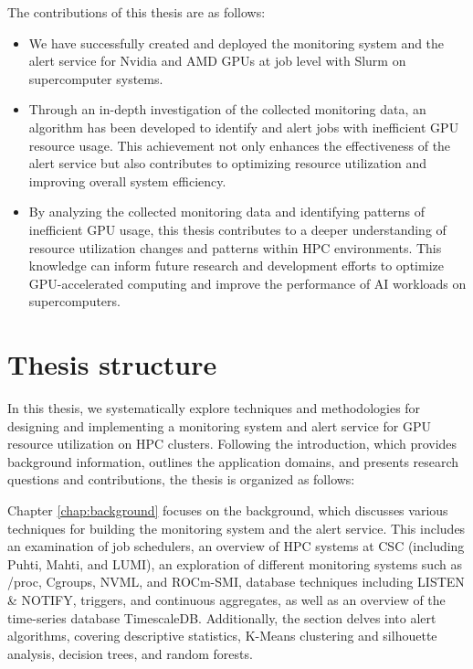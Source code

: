 The contributions of this thesis are as follows:

\begin{itemize}
    \item We have successfully created and deployed the monitoring system and the alert service for Nvidia and AMD GPUs at job level with Slurm on supercomputer systems.
    \item Through an in-depth investigation of the collected monitoring data, an algorithm has been developed to identify and alert jobs with inefficient GPU resource usage. This achievement not only enhances the effectiveness of the alert service but also contributes to optimizing resource utilization and improving overall system efficiency.
    \item By analyzing the collected monitoring data and identifying patterns of inefficient GPU usage, this thesis contributes to a deeper understanding of resource utilization changes and patterns within HPC environments. This knowledge can inform future research and development efforts to optimize GPU-accelerated computing and improve the performance of AI workloads on supercomputers.
\end{itemize}

\section{Thesis structure}

In this thesis, we systematically explore techniques and methodologies for designing and implementing a monitoring system and alert service for GPU resource utilization on HPC clusters. Following the introduction, which provides background information, outlines the application domains, and presents research questions and contributions, the thesis is organized as follows:

Chapter \ref{chap:background} focuses on the background, which discusses various techniques for building the monitoring system and the alert service. This includes an examination of job schedulers, an overview of HPC systems at CSC (including Puhti, Mahti, and LUMI), an exploration of different monitoring systems such as /proc, Cgroups, NVML, and ROCm-SMI, database techniques including LISTEN \& NOTIFY, triggers, and continuous aggregates, as well as an overview of the time-series database TimescaleDB. Additionally, the section delves into alert algorithms, covering descriptive statistics, K-Means clustering and silhouette analysis, decision trees, and random forests.

